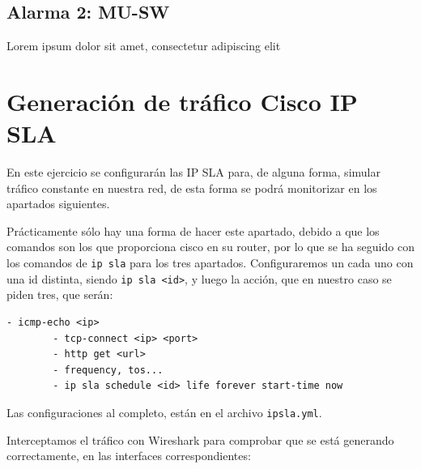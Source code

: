 \documentclass[11pt]{article}
\begin{document}
\newpage

\subsection{Alarma 2: MU-SW}
Lorem ipsum dolor sit amet, consectetur adipiscing elit 

\section{Generación de tráfico Cisco IP SLA}

En este ejercicio se configurarán las IP SLA para, de alguna forma, simular tráfico constante en nuestra red, de esta forma se podrá monitorizar en los apartados siguientes.

Prácticamente sólo hay una forma de hacer este apartado, debido a que los comandos son los que proporciona cisco en su router, por lo que se ha seguido con los comandos de \texttt{ip sla} para los tres apartados. Configuraremos un cada uno con una id distinta, siendo \texttt{ip sla <id>}, y luego la acción, que en nuestro caso se piden tres, que serán:

\begin{tcolorbox}[
    boxrule=0pt,
    title=Formato de ip sla dependiendo de la acción ,
]
    \begin{lstlisting}[gobble=6]
        - icmp-echo <ip>
        - tcp-connect <ip> <port>
        - http get <url>
        - frequency, tos...
        - ip sla schedule <id> life forever start-time now
    \end{lstlisting}
\end{tcolorbox}

Las configuraciones al completo, están en el archivo \texttt{ipsla.yml}.

Interceptamos el tráfico con Wireshark para comprobar que se está generando correctamente, en las interfaces correspondientes:
\end{document}
